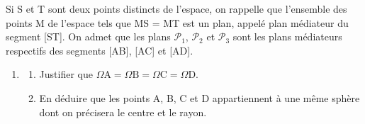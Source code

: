 \medskip

Si S et T sont deux points distincts de l'espace, on rappelle que l'ensemble des points M de l'espace tels que MS = MT est un plan, appelé plan médiateur du segment [ST]. On admet que les plans $\mathcal{P}_1$,\: $\mathcal{P}_2$ et $\mathcal{P}_3$ sont les plans médiateurs respectifs des
segments [AB], [AC] et [AD].

\begin{enumerate}[resume]
\item
	\begin{enumerate}
		\item Justifier que $\Omega \text{A} = \Omega \text{B} = \Omega \text{C} = \Omega \text{D}$.
		\item En déduire que les points A, B, C et D appartiennent à une même sphère dont
on précisera le centre et le rayon.
	\end{enumerate}
\end{enumerate}
